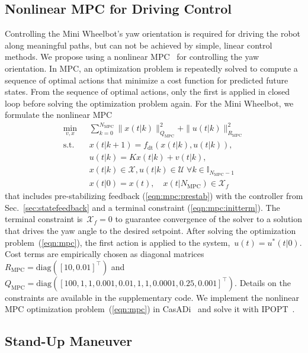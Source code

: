 \subsection{Nonlinear MPC for Driving Control}
\label{sec:nonlinearmpc}
Controlling the Mini Wheelbot's yaw orientation is required for driving the robot along meaningful paths, but can not be achieved by simple, linear control methods.
We propose using a nonlinear MPC~\cite{rawlings2017model} for controlling the yaw orientation.
In MPC, an optimization problem is repeatedly solved to compute a sequence of optimal actions that minimize a cost function for predicted future states.
From the sequence of optimal actions, only the first is applied in closed loop before solving the optimization problem again.
For the Mini Wheelbot, we formulate the nonlinear MPC
\begin{subequations}\label{eqn:mpc}
\begin{align}
\min_{v, x} & \sum_{k=0}^{N_\text{MPC}} \|x(t|k)\|^2_{Q_\text{MPC}} + \|u(t|k)\|^2_{R_\text{MPC}} \label{eqn:mpc:cost}\\
\text{s.t.}\quad & x(t|k+1) = f_\text{dt}(x(t|k), u(t|k)), \label{eqn:mpc:dyn}\\
& u(t|k) = K x(t|k) + v(t|k), \label{eqn:mpc:prestab}\\ %
& x(t|k)\in\mathcal{X}, u(t|k)\in\mathcal{U} \; \forall k\in\mathbb{I}_{N_\text{MPC}-1}\label{eqn:mpc:constr}\\
& x(t|0) = x(t),\quad x(t|N_\text{MPC}) \in \mathcal{X}_f \label{eqn:mpc:initterm}
\end{align}
\end{subequations}
that includes pre-stabilizing feedback (\ref{eqn:mpc:prestab}) with the controller from Sec.~\ref{sec:statefeedback} and a terminal constraint (\ref{eqn:mpc:initterm}).
The terminal constraint is~$\mathcal{X}_f=0$ to guarantee convergence of the solver to a solution that drives the yaw angle to the desired setpoint.
After solving the optimization problem~(\ref{eqn:mpc}), the first action is applied to the system,~$u(t)=u^*(t|0)$.
Cost terms are empirically chosen as diagonal matrices~$R_\text{MPC} = \text{diag}([10, 0.01]^\top)$ and~$Q_\text{MPC} = \text{diag}([100,1,1,0.001, 0.01, 1, 1, 0.0001, 0.25, 0.001]^\top)$.
Details on the constraints are available in the supplementary code\footnotemark[1].
We implement the nonlinear MPC optimization problem~(\ref{eqn:mpc}) in CasADi~\cite{andersson2019casadi} and solve it with IPOPT~\cite{wachter2006implementation}.

\subsection{Stand-Up Maneuver}


